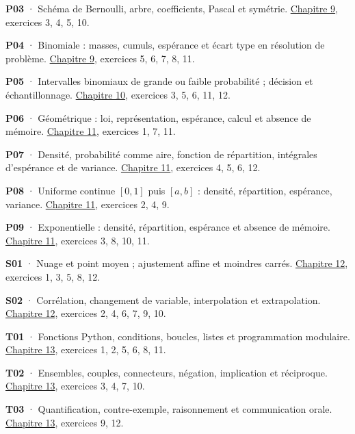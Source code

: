 \noindent\textbf{P03} · Schéma de Bernoulli, arbre, coefficients, Pascal et symétrie. \hyperref[chap-9]{Chapitre 9}, exercices 3, 4, 5, 10.\par\vspace{1.6mm}
\noindent\textbf{P04} · Binomiale : masses, cumuls, espérance et écart type en résolution de problème. \hyperref[chap-9]{Chapitre 9}, exercices 5, 6, 7, 8, 11.\par\vspace{1.6mm}
\noindent\textbf{P05} · Intervalles binomiaux de grande ou faible probabilité ; décision et échantillonnage. \hyperref[chap-10]{Chapitre 10}, exercices 3, 5, 6, 11, 12.\par\vspace{1.6mm}
\noindent\textbf{P06} · Géométrique : loi, représentation, espérance, calcul et absence de mémoire. \hyperref[chap-11]{Chapitre 11}, exercices 1, 7, 11.\par\vspace{1.6mm}
\noindent\textbf{P07} · Densité, probabilité comme aire, fonction de répartition, intégrales d’espérance et de variance. \hyperref[chap-11]{Chapitre 11}, exercices 4, 5, 6, 12.\par\vspace{1.6mm}
\noindent\textbf{P08} · Uniforme continue $[0,1]$ puis $[a,b]$ : densité, répartition, espérance, variance. \hyperref[chap-11]{Chapitre 11}, exercices 2, 4, 9.\par\vspace{1.6mm}
\noindent\textbf{P09} · Exponentielle : densité, répartition, espérance et absence de mémoire. \hyperref[chap-11]{Chapitre 11}, exercices 3, 8, 10, 11.\par\vspace{1.6mm}
\noindent\textbf{S01} · Nuage et point moyen ; ajustement affine et moindres carrés. \hyperref[chap-12]{Chapitre 12}, exercices 1, 3, 5, 8, 12.\par\vspace{1.6mm}
\noindent\textbf{S02} · Corrélation, changement de variable, interpolation et extrapolation. \hyperref[chap-12]{Chapitre 12}, exercices 2, 4, 6, 7, 9, 10.\par\vspace{1.6mm}
\noindent\textbf{T01} · Fonctions Python, conditions, boucles, listes et programmation modulaire. \hyperref[chap-13]{Chapitre 13}, exercices 1, 2, 5, 6, 8, 11.\par\vspace{1.6mm}
\noindent\textbf{T02} · Ensembles, couples, connecteurs, négation, implication et réciproque. \hyperref[chap-13]{Chapitre 13}, exercices 3, 4, 7, 10.\par\vspace{1.6mm}
\noindent\textbf{T03} · Quantification, contre-exemple, raisonnement et communication orale. \hyperref[chap-13]{Chapitre 13}, exercices 9, 12.\par\vspace{1.6mm}

